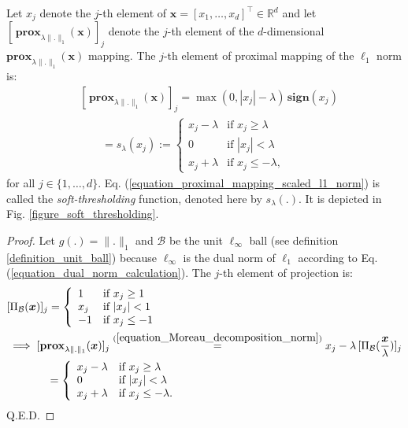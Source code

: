 \documentclass[lang=cn,10pt]{gorgeousnbook}
\numberwithin{equation}{section}%
\numberwithin{figure}{section}%
\begin{document}
\begin{lemma}\label{lemma_prox_l1_norm}
Let $x_j$ denote the $j$-th element of $\boldsymbol{x} = [x_1, \dots, x_d]^\top \in \mathbb{R}^d$ and let $[\,\textbf{prox}_{\lambda \|.\|_1}(\boldsymbol{x})]_j$ denote the $j$-th element of the $d$-dimensional $\textbf{prox}_{\lambda \|.\|_1}(\boldsymbol{x})$ mapping. 
The $j$-th element of proximal mapping of the $\ell_1$ norm is:
\begin{equation}\label{equation_proximal_mapping_scaled_l1_norm}
\begin{aligned}
&[\,\textbf{prox}_{\lambda \|.\|_1}(\boldsymbol{x})]_j = \max(0, |x_j|-\lambda)\, \textbf{sign}(x_j) \\
&~~~~~~~~~ = s_\lambda(x_j) := 
\left\{
    \begin{array}{ll}
        x_j - \lambda & \mbox{if } x_j \geq \lambda \\
        0 & \mbox{if } |x_j| < \lambda \\
        x_j + \lambda & \mbox{if } x_j \leq -\lambda,
    \end{array}
\right.
\end{aligned}
\end{equation}
for all $j \in \{1, \dots, d\}$.
Eq. (\ref{equation_proximal_mapping_scaled_l1_norm}) is called the \textit{soft-thresholding} function, denoted here by $s_\lambda(.)$. It is depicted in Fig. \ref{figure_soft_thresholding}. %
\end{lemma}
\begin{proof}
Let $g(.) = \|.\|_1$ and $\mathcal{B}$ be the unit $\ell_\infty$ ball (see definition \ref{definition_unit_ball}) because $\ell_\infty$ is the dual norm of $\ell_1$ according to Eq. (\ref{equation_dual_norm_calculation}). The $j$-th element of projection is:
\begin{align*}
&[\Pi_\mathcal{B}(\boldsymbol{x})]_j = 
\left\{
    \begin{array}{ll}
        1 & \mbox{if } x_j \geq 1 \\
        x_j & \mbox{if } |x_j| < 1 \\
        -1 & \mbox{if } x_j \leq -1 \\
    \end{array}
\right. \\
& \implies [\textbf{prox}_{\lambda \|.\|_1}(\boldsymbol{x})]_j \overset{(\ref{equation_Moreau_decomposition_norm})}{=} x_j - \lambda\, [\Pi_\mathcal{B}(\frac{\boldsymbol{x}}{\lambda})]_j \\
&~~~~~~~~~~~= 
\left\{
    \begin{array}{ll}
        x_j - \lambda & \mbox{if } x_j \geq \lambda \\
        0 & \mbox{if } |x_j| < \lambda \\
        x_j + \lambda & \mbox{if } x_j \leq -\lambda.
    \end{array}
\right.
\end{align*}
Q.E.D.
\end{proof}
\end{document}
